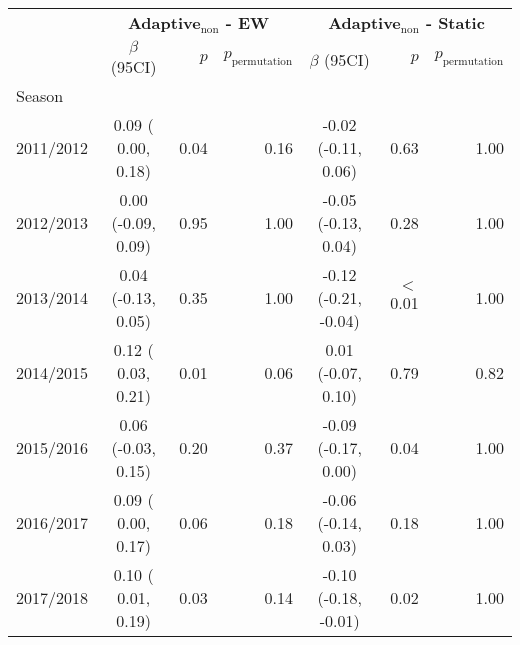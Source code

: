 \documentclass[sagev,times,Review,10pt]{sagej}
\def\adaptOpt{\textbf{adaptive$_{\text{opt}}$ }}
\begin{document}
\begin{appendix}
\begin{table}[ht!]
\caption{
Random effects regressions compared log scores between the \adaptOpt vs equally-weighted and \adaptOpt vs static ensembles.
The model included an intercept, and separate random effect for: season, region, and target.
The dependent variables is the difference in log scores paired by season-region-target-epidemic week.
Conditional mean, 95\%CI, asymptotic, and a permutation based p-value are reported.}

\end{table}


\clearpage


\begin{table}[ht!]
  \small
  \begin{tabular}{lcrrcrr}
    \hline
     & \multicolumn{3}{c}{\textbf{Adaptive$_{\text{non}}$ - EW}} & \multicolumn{3}{c}{\textbf{Adaptive$_{\text{non}}$ - Static}}\\
     & $\beta$ (95CI) & $p$ & $p_{\text{permutation}}$ & $\beta$ (95CI) & $p$ & $p_{\text{permutation}}$\\
     \hline
    
  Season\\
 \hspace{3mm} 2011/2012         & 0.09 ( 0.00, 0.18) & 0.04 & 0.16   & -0.02 (-0.11,  0.06) & 0.63    & 1.00 \\
 \hspace{3mm} 2012/2013	        & 0.00 (-0.09, 0.09) & 0.95 & 1.00   & -0.05 (-0.13,  0.04) & 0.28    & 1.00 \\
 \hspace{3mm} 2013/2014	        & 0.04 (-0.13, 0.05) & 0.35 & 1.00   & -0.12 (-0.21, -0.04) & $<$0.01 & 1.00 \\
 \hspace{3mm} 2014/2015	        & 0.12 ( 0.03, 0.21) & 0.01 & 0.06   &  0.01 (-0.07,  0.10) & 0.79    & 0.82 \\
 \hspace{3mm} 2015/2016	        & 0.06 (-0.03, 0.15) & 0.20 & 0.37   & -0.09 (-0.17,  0.00) & 0.04    & 1.00 \\
 \hspace{3mm} 2016/2017	        & 0.09 ( 0.00, 0.17) & 0.06 & 0.18   & -0.06 (-0.14,  0.03) & 0.18    & 1.00 \\
 \hspace{3mm} 2017/2018	        & 0.10 ( 0.01, 0.19) & 0.03 & 0.14   & -0.10 (-0.18, -0.01) & 0.02    & 1.00 \\ 


\end{tabular}
\end{table}
\end{appendix}
\end{document}
